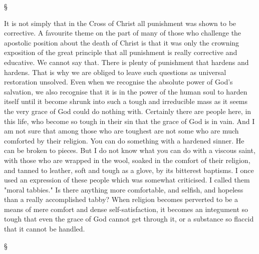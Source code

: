 \documentclass[12pt,a5paper,twoside,titlepage]{book}
\begin{document}
\begin{center}
\S
\end{center}

It is not simply that in the Cross of Christ 
all punishment was shown to be corrective. A 
favourite theme on the part of many of those 
who challenge the apostolic position about the 
death of Christ is that it was only the crowning 
exposition of the great principle that all punishment 
is really corrective and educative. We 
cannot say that. There is plenty of punishment 
that hardens and hardens. That is why we are 
obliged to leave such questions as universal 
restoration unsolved. Even when we recognise 
the absolute power of God's salvation, we also 
recognise that it is in the power of the human 
soul to harden itself until it become shrunk into 
such a tough and irreducible mass as it seems 
the very grace of God could do nothing with. 
Certainly there are people here, in this life, who 
become so tough in their sin that the grace of 
God is in vain. And I am not sure that among 
those who are toughest are not some who are 
much comforted by their religion. You can do 
something with a hardened sinner. He can be 
broken to pieces. But I do not know what 
you can do with a viscous saint, with those 
who are wrapped in the wool, soaked in the 
comfort of their religion, and tanned to leather, 
soft and tough as a glove, by its bitterest baptisms. 
I once used an expression of these people 
which was somewhat criticised. I called them 
"moral tabbies." Is there anything more comfortable, 
and selfish, and hopeless than a really 
accomplished tabby? When religion becomes 
perverted to be a means of mere comfort and 
dense self-satisfaction, it becomes an integument 
so tough that even the grace of God 
cannot get through it, or a substance so flaccid 
that it cannot be handled. 

\begin{center}
\S
\end{center}
\end{document}
